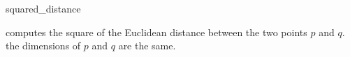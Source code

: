 \begin{ccRefFunction}{squared_distance}

{computes the square of the Euclidean distance between the two 
points $p$ and $q$.
\ccPrecond the dimensions of $p$ and $q$ are the same.}

\end{ccRefFunction}
